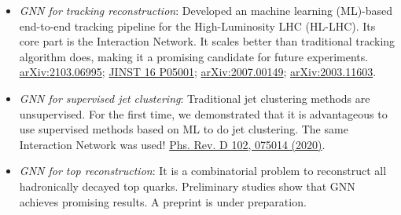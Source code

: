 \begin{itemize}
    \item \textit{GNN for tracking reconstruction}: Developed an machine learning (ML)-based end-to-end tracking pipeline for the High-Luminosity LHC (HL-LHC). Its core part is the Interaction Network. It scales better than traditional tracking algorithm does, making it a promising candidate for future experiments. \href{https://arxiv.org/abs/2103.06995}{arXiv:2103.06995}; \href{https://iopscience.iop.org/article/10.1088/1748-0221/16/05/P05001}{JINST 16 P05001}; \href{https://arxiv.org/abs/2007.00149}{arXiv:2007.00149}; \href{https://arxiv.org/abs/2003.11603}{arXiv:2003.11603}.
    
    \item \textit{GNN for supervised jet clustering}: Traditional jet clustering methods are unsupervised. For the first time, we demonstrated that it is advantageous to use supervised methods based on ML to do jet clustering. The same Interaction Network was used! \href{https://journals.aps.org/prd/abstract/10.1103/PhysRevD.102.075014}{Phs. Rev. D 102, 075014 (2020)}.
    
    \item \textit{GNN for top reconstruction}: It is a combinatorial problem to reconstruct all hadronically decayed top quarks. Preliminary studies show that GNN achieves promising results. A preprint is under preparation.
\end{itemize}

